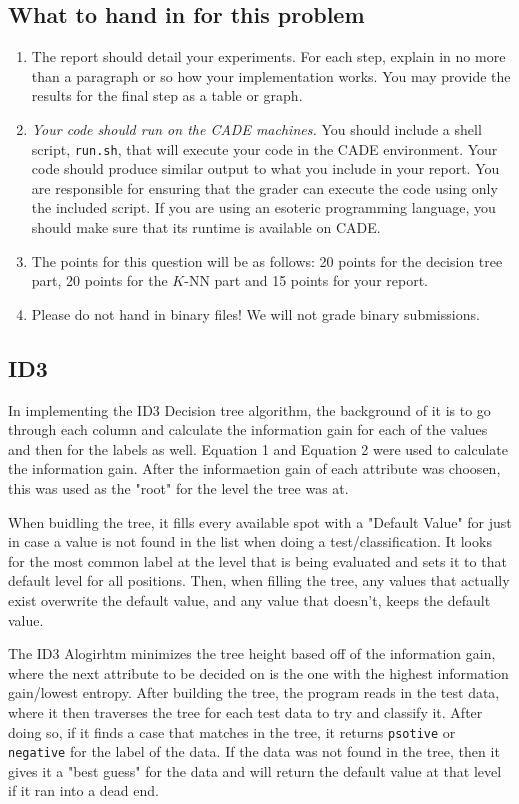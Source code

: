 \documentclass[listings, listings-bw, listings-color, listings-sv]{article}
\begin{document}
\subsection{What to hand in for this problem}
\label{sec-3-3}
\begin{enumerate}
\item The report should detail your experiments. For each step, explain in no more than a paragraph or so how your implementation works. You may provide the results for the final step as a table or graph.
\item \emph{Your code should run on the CADE machines.} You should include a shell script, \texttt{run.sh}, that will execute your code in the CADE environment. Your code should produce similar output to what you include in your report. 
You are responsible for ensuring that the grader can execute the code using only the included script. If you are using an esoteric programming language, you should make sure that its runtime is available on CADE.
\item The points for this question will be as follows: 20 points for the decision tree part, 20 points for the $K$-NN part and 15 points for your report.
\item Please do not hand in binary files! We will not grade binary submissions.
\end{enumerate}
\subsection{ID3}
\label{sec-3-4}
In implementing the ID3 Decision tree algorithm, the background of it is to go through each column and calculate the information gain for each of the values and then for the labels as well. Equation 1 and Equation 2 were used to calculate the information gain. After the informaetion gain of each attribute was choosen, this was used as the "root" for the level the tree was at. 

When buidling the tree, it fills every available spot with a "Default Value" for just in case a value is not found in the list when doing a test/classification. It looks for the most common label at the level that is being evaluated and sets it to that default level for all positions. Then, when filling the tree, any values that actually exist overwrite the default value, and any value that doesn't, keeps the default value.

The ID3 Alogirhtm minimizes the tree height based off of the information gain, where the next attribute to be decided on is the one with the highest information gain/lowest entropy. After building the tree, the program reads in the test data, where it then traverses the tree for each test data to try and classify it. After doing so, if it finds a case that matches in the tree, it returns \verb~psotive~ or \verb~negative~ for the label of the data. If the data was not found in the tree, then it gives it a "best guess" for the data and will return the default value at that level if it ran into a dead end.
\end{document}
